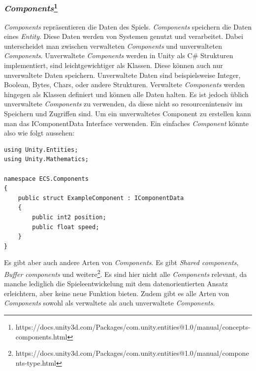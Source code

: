 \subsubsection{\textit{Components}\footnote{https://docs.unity3d.com/Packages/com.unity.entities@1.0/manual/concepts-components.html}}
\textit{Components} repräsentieren die Daten des Spiels. \textit{Components} speichern die Daten eines \textit{Entity}. Diese Daten werden von Systemen genutzt und verarbeitet. Dabei unterscheidet man zwischen verwalteten \textit{Components} und unverwalteten \textit{Components}. Unverwaltete \textit{Components} werden in Unity als C\# Strukturen implementiert, sind leichtgewichtiger als Klassen. Diese können auch nur unverwaltete Daten speichern. Unverwaltete Daten sind beispielsweise Integer, Boolean, Bytes, Chars, oder andere Strukturen. Verwaltete \textit{Components} werden hingegen als Klassen definiert und können alle Daten halten. Es ist jedoch üblich unverwaltete \textit{Components} zu verwenden, da diese nicht so resourcenintensiv im Speichern und Zugriffen sind. Um ein unverwaltetes Component zu erstellen kann man das IComponentData Interface verwenden. Ein einfaches \textit{Component} könnte also wie folgt aussehen:
\begin{lstlisting}[style=code, caption={Beispiel unverwaltetes \textit{Component}}]
using Unity.Entities;
using Unity.Mathematics;

namespace ECS.Components
{
    public struct ExampleComponent : IComponentData
    {
        public int2 position;
        public float speed;
    }
}
\end{lstlisting}
Es gibt aber auch andere Arten von \textit{Components}. Es gibt \textit{Shared components}, \textit{Buffer components} und weitere\footnote{https://docs.unity3d.com/Packages/com.unity.entities@1.0/manual/components-type.html}. Es sind hier nicht alle \textit{Components} relevant, da manche lediglich die Spieleentwickelung mit dem datenorientierten Ansatz erleichtern, aber keine neue Funktion bieten. Zudem gibt es alle Arten von \textit{Components} sowohl als verwaltete als auch unverwaltete \textit{Components}.\\
